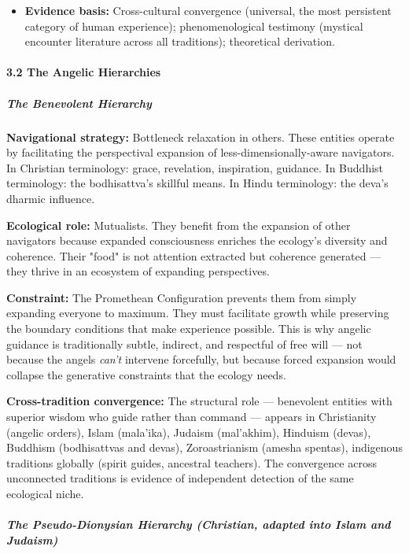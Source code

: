 \begin{itemize}[nosep,leftmargin=*]
  \item \textbf{Evidence basis:} Cross-cultural convergence (universal, the most persistent category of human experience); phenomenological testimony (mystical encounter literature across all traditions); theoretical derivation.
\end{itemize}


\paragraph*{3.2 The Angelic Hierarchies}


\subparagraph*{The Benevolent Hierarchy}


\textbf{Navigational strategy:} Bottleneck relaxation in others. These entities operate by facilitating the perspectival expansion of less-dimensionally-aware navigators. In Christian terminology: grace, revelation, inspiration, guidance. In Buddhist terminology: the bodhisattva's skillful means. In Hindu terminology: the deva's dharmic influence.


\textbf{Ecological role:} Mutualists. They benefit from the expansion of other navigators because expanded consciousness enriches the ecology's diversity and coherence. Their "food" is not attention extracted but coherence generated — they thrive in an ecosystem of expanding perspectives.


\textbf{Constraint:} The Promethean Configuration prevents them from simply expanding everyone to maximum. They must facilitate growth while preserving the boundary conditions that make experience possible. This is why angelic guidance is traditionally subtle, indirect, and respectful of free will — not because the angels \textit{can't} intervene forcefully, but because forced expansion would collapse the generative constraints that the ecology needs.


\textbf{Cross-tradition convergence:} The structural role — benevolent entities with superior wisdom who guide rather than command — appears in Christianity (angelic orders), Islam (mala'ika), Judaism (mal'akhim), Hinduism (devas), Buddhism (bodhisattvas and devas), Zoroastrianism (amesha spentas), indigenous traditions globally (spirit guides, ancestral teachers). The convergence across unconnected traditions is evidence of independent detection of the same ecological niche.


\subparagraph*{The Pseudo-Dionysian Hierarchy (Christian, adapted into Islam and Judaism)}


